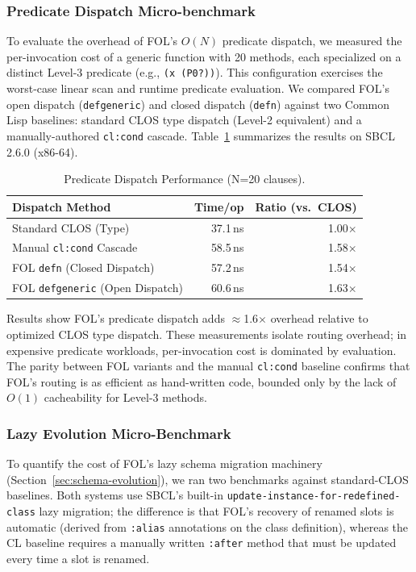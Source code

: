 \documentclass[sigconf,nonacm]{acmart}
\begin{document}
\subsubsection{Predicate Dispatch Micro-benchmark}
\label{sec:predbench}

To evaluate the overhead of FOL's $O(N)$ predicate dispatch, we measured the per-invocation cost of a generic function with 20 methods, each specialized on a distinct Level-3 predicate (e.g., \texttt{(x (P0?))}). This configuration exercises the worst-case linear scan and runtime predicate evaluation. We compared FOL's open dispatch (\texttt{defgeneric}) and closed dispatch (\texttt{defn}) against two Common Lisp baselines: standard CLOS type dispatch (Level-2 equivalent) and a manually-authored \texttt{cl:cond} cascade. Table~\ref{tab:dispatch-perf} summarizes the results on SBCL 2.6.0 (x86-64).

\begin{table}[htbp]
\centering
\caption{Predicate Dispatch Performance (N=20 clauses).}
\label{tab:dispatch-perf}
\begin{tabular}{lrr}
\toprule
\textbf{Dispatch Method} & \textbf{Time/op} & \textbf{Ratio (vs.\ CLOS)} \\
\midrule
Standard CLOS (Type) & 37.1\,ns & 1.00$\times$ \\
Manual \texttt{cl:cond} Cascade & 58.5\,ns & 1.58$\times$ \\
FOL \texttt{defn} (Closed Dispatch) & 57.2\,ns & 1.54$\times$ \\
FOL \texttt{defgeneric} (Open Dispatch) & 60.6\,ns & 1.63$\times$ \\
\bottomrule
\end{tabular}
\end{table}

Results show FOL's predicate dispatch adds $\approx$1.6$\times$ overhead relative to optimized CLOS type dispatch. These measurements isolate routing overhead; in expensive predicate workloads, per-invocation cost is dominated by evaluation. The parity between FOL variants and the manual \texttt{cl:cond} baseline confirms that FOL's routing is as efficient as hand-written code, bounded only by the lack of $O(1)$ cacheability for Level-3 methods.

\subsubsection{Lazy Evolution Micro-Benchmark}
\label{sec:evobench}

To quantify the cost of FOL's lazy schema migration machinery (Section~\ref{sec:schema-evolution}), we ran two benchmarks against standard-CLOS baselines.
Both systems use SBCL's built-in \texttt{update-instance-for-redefined-class} lazy migration; the difference is that FOL's recovery of renamed slots is automatic (derived from \texttt{:alias} annotations on the class definition), whereas the CL baseline requires a manually written \texttt{:after} method that must be updated every time a slot is renamed.
\end{document}
